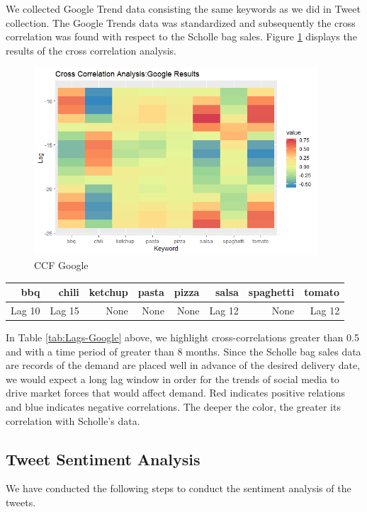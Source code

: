 \documentclass[12pt,oneside]{chicagocapstone}
\begin{document}
We collected Google Trend data consisting the same keywords as we did in
Tweet collection. The Google Trends data was standardized and
subsequently the cross correlation was found with respect to the Scholle
bag sales. Figure \ref{fig:ccf-google} displays the results of the cross
correlation analysis.
\begin{figure}

{\centering \includegraphics[width=400px]{figure/CCF_Google_Results} 

}

\caption{CCF Google}\label{fig:ccf-google}
\end{figure}
\begin{longtable}[]{@{}rrrrrrrr@{}}
\toprule
bbq & chili & ketchup & pasta & pizza & salsa & spaghetti &
tomato\tabularnewline
\midrule
\endhead
Lag 10 & Lag 15 & None & None & None & Lag 12 & None & Lag
12\tabularnewline
\bottomrule
\end{longtable}
In Table \ref{tab:Lags-Google} above, we highlight cross-correlations
greater than 0.5 and with a time period of greater than 8 months. Since
the Scholle bag sales data are records of the demand are placed well in
advance of the desired delivery date, we would expect a long lag window
in order for the trends of social media to drive market forces that
would affect demand. Red indicates positive relations and blue indicates
negative correlations. The deeper the color, the greater its correlation
with Scholle's data.

\subsection*{Tweet Sentiment Analysis}\label{tweet-sentiment-analysis}

We have conducted the following steps to conduct the sentiment analysis
of the tweets.
\end{document}
